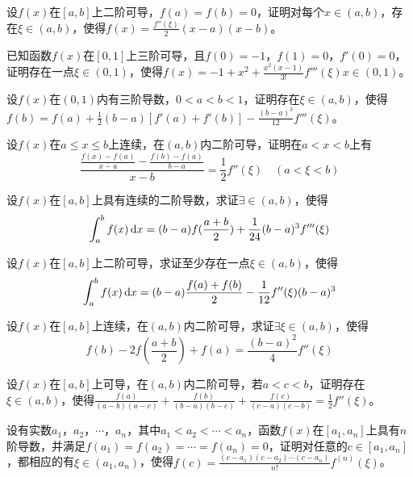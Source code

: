 \begin{example}
	设$f(x)$在$[a,b]$上二阶可导，$f(a)=f(b)=0$，证明对每个$x\in(a,b)$，存在$\xi\in(a,b)$，使得$f(x)=\frac{f''(\xi)}{2}(x-a)(x-b)$。
\end{example}

\begin{example}
	已知函数$f(x)$在$[0,1]$上三阶可导，且$f(0)=-1$，$f(1)=0$，$f'(0)=0$，证明存在一点$\xi\in(0,1)$，使得$f(x)=-1+x^2+\frac{x^2(x-1)}{3!}f'''(\xi)x\in(0,1)$。
\end{example}

\begin{example}
	设$f(x)$在$(0,1)$内有三阶导数，$0<a<b<1$，证明存在$\xi\in(a,b)$，使得$f(b)=f(a)+\frac{1}{2}(b-a)[f'(a)+f'(b)]-\frac{(b-a)^3}{12}f'''(\xi)$。
\end{example}

\begin{example}
	设$f(x)$在$a\leqslant x\leqslant b$上连续，在$(a,b)$内二阶可导，证明在$a<x<b$上有\[\frac{\frac{f(x)-f(a)}{x-a}-\frac{f(b)-f(a)}{b-a}}{x-b}=\frac{1}{2}f''(\xi)\quad(a<\xi<b)\]
\end{example}

\begin{example}
	设$f(x)$在$[a,b]$上具有连续的二阶导数，求证$\exists\in(a,b)$，使得\[\int_{a}^{b}f(x)\,\mathrm{d} x=(b-a)f(\frac{a+b}{2})+\frac{1}{24}(b-a)^3f'''(\xi)\]
\end{example}

\begin{example}
	设$f(x)$在$[a,b]$上二阶可导，求证至少存在一点$\xi\in(a,b)$，使得\[\int_{a}^{b}f(x)\,\mathrm{d} x=(b-a)\frac{f(a)+f(b)}{2}-\frac{1}{12}f''(\xi)(b-a)^3\]
\end{example}

\begin{example}
	设$f(x)$在$[a,b]$上连续，在$(a,b)$内二阶可导，求证$\exists\xi\in(a,b)$，使得\[f(b)-2f(\frac{a+b}{2})+f(a)=\frac{(b-a)^2}{4}f''(\xi)\]
\end{example}

\begin{example}
	设$f(x)$在$[a,b]$上可导，在$(a,b)$内二阶可导，若$a<c<b$，证明存在$\xi\in(a,b)$，使得$\frac{f(a)}{(a-b)(a-c)}+\frac{f(b)}{(b-a)(b-c)}+\frac{f(c)}{(c-a)(c-b)}=\frac{1}{2}f''(\xi)$。
\end{example}

\begin{example}
	设有实数$a_1$，$a_2$，$\cdots$，$a_n$，其中$a_1<a_2<\cdots<a_n$，函数$f(x)$在$[a_1,a_n]$上具有$n$阶导数，并满足$f(a_1)=f(a_2)=\cdots=f(a_n)=0$，证明对任意的$c\in[a_1,a_n]$，都相应的有$\xi\in(a_1,a_n)$，使得$f(c)=\frac{(c-a_1)(c-a_2)\cdots(c-a_n)}{n!}f^{(n)}(\xi)$。
\end{example}


